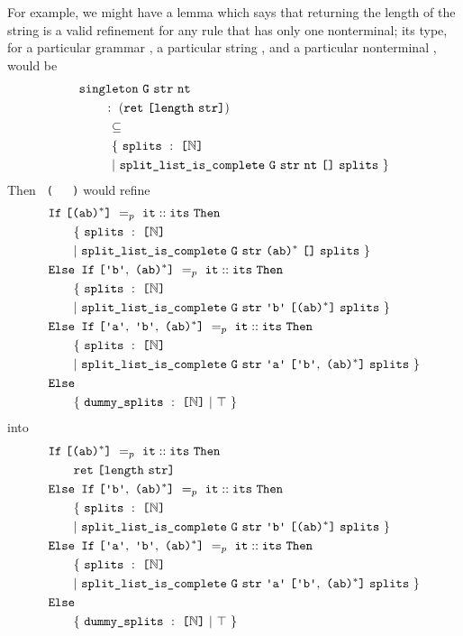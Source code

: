       For example, we might have a lemma  which says that returning the length of the string is a valid refinement for any rule that has only one nonterminal; its type, for a particular grammar , a particular string , and a particular nonterminal , would be
\begin{align*}
& \fname{singleton}~\farg{G}~\farg{str}~\farg{nt} \\
& \qquad:~(\fname{ret}~\valuelist{\fname{length}~\farg{str}}) \\
&\qquad~\subseteq\\
&\ndcompfor[\phantom{:~}\qquad]{\nt{\farg{nt}}}{\nil}
\end{align*}
    Then \texttt{~(~\termhole~\termhole~)} would refine 
\begin{align*}
& \fname{If}~\valuelist{\nt{(ab)\ensuremath{^*}}}~=_p~\cons{\farg{it}}{\farg{its}}~\fname{Then} \\
&\ndcompfor[\qquad]{\nt{(ab)\ensuremath{^*}}}{\nil} \\
& \fname{Else~If}~\valuelist{\terminal{b},~\nt{(ab)\ensuremath{^*}}}~=_p~\cons{\farg{it}}{\farg{its}}~\fname{Then} \\
&\ndcompfor[\qquad]{\terminal{b}}{\valuelist{\nt{(ab)\ensuremath{^*}}}} \\
& \fname{Else~If}~\valuelist{\terminal{a},~\terminal{b},~\nt{(ab)\ensuremath{^*}}}~=_p~\cons{\farg{it}}{\farg{its}}~\fname{Then} \\
&\ndcompfor[\qquad]{\terminal{a}}{\valuelist{\terminal{b},~\nt{(ab)\ensuremath{^*}}}} \\
& \fname{Else} \\
&\qquad\{~\farg{dummy\_splits}~:~\typelist{\mathbb{N}}~|~\True~\}
\end{align*}
into
\begin{align*}
& \fname{If}~\valuelist{\nt{(ab)\ensuremath{^*}}}~=_p~\cons{\farg{it}}{\farg{its}}~\fname{Then} \\
&\qquad\fname{ret}~\valuelist{\fname{length}~\farg{str}}\\
& \fname{Else~If}~\valuelist{\terminal{b},~\nt{(ab)\ensuremath{^*}}}~=_p~\cons{\farg{it}}{\farg{its}}~\fname{Then} \\
&\ndcompfor[\qquad]{\terminal{b}}{\valuelist{\nt{(ab)\ensuremath{^*}}}} \\
& \fname{Else~If}~\valuelist{\terminal{a},~\terminal{b},~\nt{(ab)\ensuremath{^*}}}~=_p~\cons{\farg{it}}{\farg{its}}~\fname{Then} \\
&\ndcompfor[\qquad]{\terminal{a}}{\valuelist{\terminal{b},~\nt{(ab)\ensuremath{^*}}}} \\
& \fname{Else} \\
&\qquad\{~\farg{dummy\_splits}~:~\typelist{\mathbb{N}}~|~\True~\}
\end{align*}

